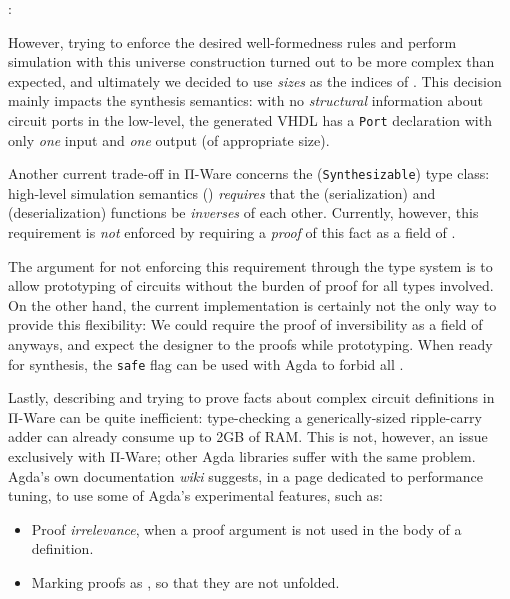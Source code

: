             \begin{center}
                 :  \AY{(}  \AY{)} 
            \end{center}

            However, trying to enforce the desired well-formedness rules and perform simulation
            with this universe construction turned out to be more complex than expected,
            and ultimately we decided to use \emph{sizes} as the indices of .
            This decision mainly impacts the synthesis semantics:
            with no \emph{structural} information about circuit ports in the low-level,
            the generated \ac{VHDL} has a \texttt{Port} declaration with only
            \emph{one} input and \emph{one} output (of appropriate size).

            Another current trade-off in Π-Ware concerns the  (\texttt{Synthesizable})
            type class: high-level simulation semantics () \emph{requires} that the
             (serialization) and  (deserialization) functions be \emph{inverses} of each other.
            Currently, however, this requirement is \emph{not} enforced by requiring a \emph{proof} of
            this fact as a field of .

            The argument for not enforcing this requirement through the type system is to allow
            prototyping of circuits without the burden of proof for all types involved.
            On the other hand, the current implementation is certainly not the only way to provide this flexibility:
            We could require the proof of inversibility as a field of  anyways,
            and expect the designer to  the proofs while prototyping.
            When ready for synthesis, the \texttt{safe} flag can be used with Agda to forbid all .

            Lastly, describing and trying to prove facts about complex circuit definitions in Π-Ware
            can be quite inefficient: type-checking a generically-sized ripple-carry adder can already
            consume up to 2GB of RAM.
            This is not, however, an issue exclusively with Π-Ware; other Agda libraries suffer with the same problem.
            Agda's own documentation \emph{wiki} suggests, in a page dedicated to performance tuning,
            to use some of Agda's experimental features, such as:

            \begin{itemize}
                \item Proof \emph{irrelevance}, when a proof argument is not used in the body of a definition.
                \item Marking proofs as , so that they are not unfolded.
            \end{itemize}


